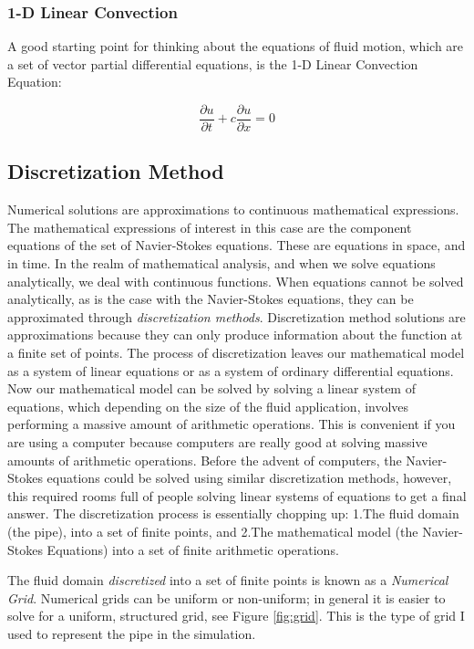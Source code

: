 \documentclass[twocolumn,12pth]{article}
\begin{document}
\subsubsection{1-D Linear Convection}

A good starting point for thinking about the equations of fluid motion, which are a set of vector partial differential equations, is the 1-D Linear Convection Equation:

\begin{equation}
\frac{\partial{u}}{\partial{t}} + c\frac{\partial{u}}{\partial{x}} = 0
\end{equation}


\subsection{Discretization Method}

Numerical solutions are approximations to continuous mathematical expressions.
The mathematical expressions of interest in this case are the component equations of the set of Navier-Stokes equations.
These are equations in space, and in time. 
In the realm of mathematical analysis, and when we solve equations analytically, we deal with continuous functions.
When equations cannot be solved analytically, as is the case with the Navier-Stokes equations, they can be approximated through \textit{discretization methods}.
Discretization method solutions are approximations because they can only produce information about the function at a finite set of points.
The process of discretization leaves our mathematical model as a system of linear equations or as a system of ordinary differential equations.
Now our mathematical model can be solved by solving a linear system of equations, which depending on the size of the fluid application, involves performing a massive amount of arithmetic operations.
This is convenient if you are using a computer because computers are really good at solving massive amounts of arithmetic operations.
Before the advent of computers, the Navier-Stokes equations could be solved using similar discretization methods, however, this required rooms full of people solving linear systems of equations to get a final answer.
The discretization process is essentially chopping up: 1.The fluid domain (the pipe), into a set of finite points, and 2.The mathematical model (the Navier-Stokes Equations) into a set of finite arithmetic operations.

The fluid domain \textit{discretized} into a set of finite points is known as a \textit{Numerical Grid}.
Numerical grids can be uniform or non-uniform; in general it is easier to solve for a uniform, structured grid, see Figure \ref{fig:grid}.
This is the type of grid I used to represent the pipe in the simulation.
\end{document}
